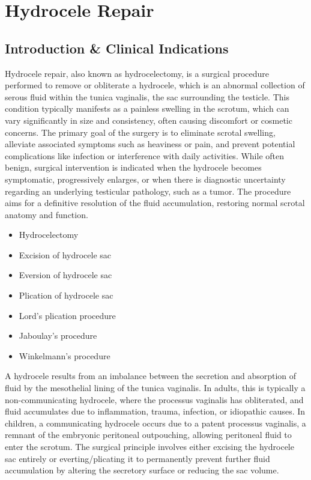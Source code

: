 \chapter{Hydrocele Repair}

\section*{Introduction \& Clinical Indications}
Hydrocele repair, also known as hydrocelectomy, is a surgical procedure performed to remove or obliterate a hydrocele, which is an abnormal collection of serous fluid within the tunica vaginalis, the sac surrounding the testicle. This condition typically manifests as a painless swelling in the scrotum, which can vary significantly in size and consistency, often causing discomfort or cosmetic concerns. The primary goal of the surgery is to eliminate scrotal swelling, alleviate associated symptoms such as heaviness or pain, and prevent potential complications like infection or interference with daily activities. While often benign, surgical intervention is indicated when the hydrocele becomes symptomatic, progressively enlarges, or when there is diagnostic uncertainty regarding an underlying testicular pathology, such as a tumor. The procedure aims for a definitive resolution of the fluid accumulation, restoring normal scrotal anatomy and function.

\begin{itemize}
  \item Hydrocelectomy
  \item Excision of hydrocele sac
  \item Eversion of hydrocele sac
  \item Plication of hydrocele sac
  \item Lord's plication procedure
  \item Jaboulay's procedure
  \item Winkelmann's procedure
\end{itemize}

A hydrocele results from an imbalance between the secretion and absorption of fluid by the mesothelial lining of the tunica vaginalis. In adults, this is typically a non-communicating hydrocele, where the processus vaginalis has obliterated, and fluid accumulates due to inflammation, trauma, infection, or idiopathic causes. In children, a communicating hydrocele occurs due to a patent processus vaginalis, a remnant of the embryonic peritoneal outpouching, allowing peritoneal fluid to enter the scrotum. The surgical principle involves either excising the hydrocele sac entirely or everting/plicating it to permanently prevent further fluid accumulation by altering the secretory surface or reducing the sac volume.

